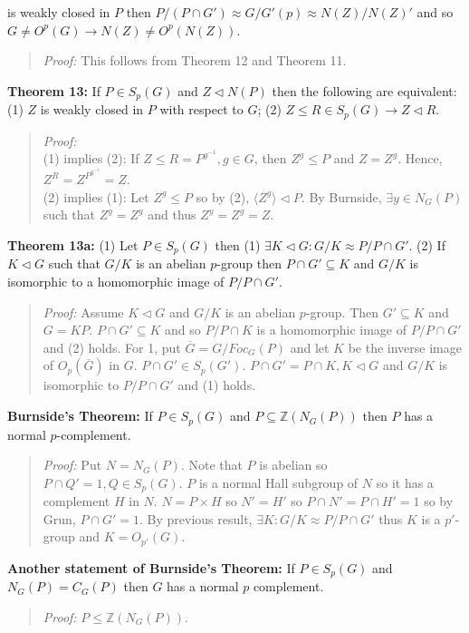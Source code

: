 is weakly closed in $P$ then
$P/(P \cap G') \approx G/G' (p) \approx N(Z)/N(Z)'$ and so 
$G \ne O^p(G) \rightarrow N(Z) \ne O^p(N(Z))$.
\begin{quote}
\emph{Proof:}  
This follows from Theorem 12 and Theorem 11.
\end{quote}
{\bf Theorem 13:} If
$P \in S_p(G)$ and $Z \lhd N(P)$ then the following are equivalent:
(1) $Z$ is weakly closed in $P$ with respect to $G$;
(2) $Z \le R \in S_p(G) \rightarrow Z \lhd R$.
\begin{quote}
\emph{Proof:} 
\\
(1) implies (2): If $Z \le R = P^{g^{-1}}, g \in G$, then $Z^g \le P$ and $Z=Z^g$.
Hence, $Z^R= Z^{P^{g^{-1}}} = Z$.\\
(2) implies (1):  Let $Z^g \le P$ so by (2), $ \langle Z^g \rangle \lhd P$.  
By Burnside, $\exists y \in N_G(P)$
such that  $Z^y=Z^g$ and thus $Z^y=Z^g=Z$.
\end{quote}
{\bf Theorem 13a:}  (1) Let $P \in S_p(G)$ then (1) $\exists K \lhd G: G/K \approx P/ P \cap G'$.
(2) If $K \lhd G$ such that $G/K$ is an abelian $p$-group then $P \cap G' \subseteq K$ 
and $G/K$ is isomorphic to a homomorphic image of $P/P \cap G'$.
\begin{quote}
\emph{Proof:}  Assume $K \lhd G$ and $G/K$ is an abelian $p$-group.  Then $G' \subseteq K$ and
$G= KP$.  $P \cap G' \subseteq K$ and so $P/P \cap K$ is a homomorphic image of $P/P \cap G'$ and (2)
holds.  For 1, put ${\overline G} = G/Foc_G(P)$ and let
$K$ be the inverse image of $O_{p}({\overline G})$
in $G$.  $P \cap G' \in S_p(G')$.  
$P \cap G' = P \cap K, K \lhd G$ and $G/K$ is isomorphic to $P/P \cap G'$ and (1) holds.
\end{quote}
{\bf Burnside's Theorem:} 
If $P \in S_p(G)$ and $P \subseteq {\mathbb Z}(N_G(P))$ then $P$ has a normal
$p$-complement.
\begin{quote}
\emph{Proof:}  Put $N=N_G(P)$.  Note that $P$ is abelian so $P \cap Q'= 1, Q \in S_p(G)$.
$P$ is a normal Hall subgroup of $N$ so it has a complement $H$ in $N$.  $N= P \times H$ so
$N' = H'$ so $P \cap N' = P \cap H' = 1$ so by Grun, $P \cap G'=1$.  By previous result, $\exists K:
G/K \approx P/P \cap G'$ thus $K$ is a $p'$-group and $K= O_{p'}(G)$.
\end{quote}
{\bf Another statement of Burnside's Theorem:} 
If $P \in S_p(G)$ and $N_G(P) = C_G(P)$ then $G$ has a normal $p$ complement.
\begin{quote}
\emph{Proof:} 
$P \leq {\mathbb Z}(N_G(P))$.
\end{quote}
